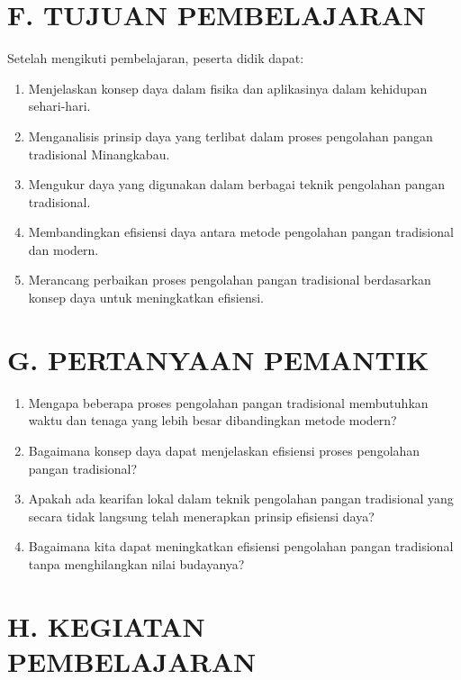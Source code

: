\documentclass[12pt,a4paper]{article}
\begin{document}
\section*{F. TUJUAN PEMBELAJARAN}
Setelah mengikuti pembelajaran, peserta didik dapat:
\begin{enumerate}[leftmargin=*]
    \item Menjelaskan konsep daya dalam fisika dan aplikasinya dalam kehidupan sehari-hari.
    \item Menganalisis prinsip daya yang terlibat dalam proses pengolahan pangan tradisional Minangkabau.
    \item Mengukur daya yang digunakan dalam berbagai teknik pengolahan pangan tradisional.
    \item Membandingkan efisiensi daya antara metode pengolahan pangan tradisional dan modern.
    \item Merancang perbaikan proses pengolahan pangan tradisional berdasarkan konsep daya untuk meningkatkan efisiensi.
\end{enumerate}

\section*{G. PERTANYAAN PEMANTIK}
\begin{tcolorbox}[colback=white,colframe=black,boxrule=1pt]
\begin{enumerate}[leftmargin=*]
    \item Mengapa beberapa proses pengolahan pangan tradisional membutuhkan waktu dan tenaga yang lebih besar dibandingkan metode modern?
    \item Bagaimana konsep daya dapat menjelaskan efisiensi proses pengolahan pangan tradisional?
    \item Apakah ada kearifan lokal dalam teknik pengolahan pangan tradisional yang secara tidak langsung telah menerapkan prinsip efisiensi daya?
    \item Bagaimana kita dapat meningkatkan efisiensi pengolahan pangan tradisional tanpa menghilangkan nilai budayanya?
\end{enumerate}
\end{tcolorbox}

\section*{H. KEGIATAN PEMBELAJARAN}
\end{document}
